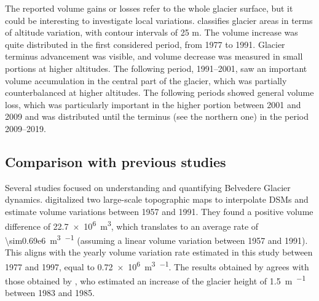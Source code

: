 The reported volume gains or losses refer to the whole glacier surface, but it could be interesting to investigate local variations. 
 classifies glacier areas in terms of altitude variation, with contour intervals of 25 m. 
The volume increase was quite distributed in the first considered period, from 1977 to 1991. 
Glacier terminus advancement was visible, and volume decrease was measured in small portions at higher altitudes. 
The following period, 1991–2001, saw an important volume accumulation in the central part of the glacier, which was partially counterbalanced at higher altitudes. 
The following periods showed general volume loss, which was particularly important in the higher portion between 2001 and 2009 and was distributed until the terminus (see the northern one) in the period 2009–2019.

\subsection{Comparison with previous studies}

Several studies focused on understanding and quantifying Belvedere Glacier dynamics. 
\citet{Diolaiuti2003} digitalized two large-scale topographic maps to interpolate DSMs and estimate volume variations between 1957 and 1991. 
They found a positive volume difference of \SI{+22.7e6}{\cubic\meter}, which translates to an average rate of \SI{\sim0.69e6}{\cubic\meter\per\year} (assuming a linear volume variation between 1957 and 1991). 
This aligns with the yearly volume variation rate estimated in this study between 1977 and 1997, equal to \SI{+0.72e6}{\cubic\meter\per\year}.
The results obtained by \citet{Diolaiuti2003} agrees with those obtained by \citet{Roethlisberger1985}, who estimated an increase of the glacier height of 
\SI{+1.5}{\meter\per\year} between 1983 and 1985.

\makechapterbibliography{}